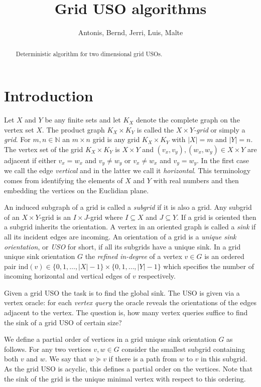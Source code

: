 \documentclass[a4paper,10pt]{article}
\title{Grid USO algorithms}
\author{Antonis, Bernd, Jerri, Luis, Malte}
\newcommand{\indegree}{refined in-degree\xspace}
\newcommand{\ind}{\ensuremath{\mathrm{ind}}}
\begin{document}
\maketitle 

\begin{abstract}
Deterministic algorithm for two dimensional grid USOs.
\end{abstract}

\section{Introduction}

Let $X$ and $Y$ be any finite sets and let $K_X$ denote the complete graph on the vertex set $X$. The product graph $K_X\times K_Y$ is called the \emph{$X\times Y$-grid} or simply a \emph{grid}. For $m,n \in \mathbb{N}$ an $m\times n$ grid is any grid $K_X\times K_Y$ with $|X| = m$ and $|Y| = n$. The vertex set of the grid $K_X\times K_Y$ is $X\times Y$ and $(v_x,v_y),(w_x,w_y) \in X\times Y$ are adjacent if either $v_x = w_x$ and $v_y \not= w_y$ or $v_x \not= w_x$ and $v_y = w_y$. In the first case we call the edge \emph{vertical} and in the latter we call it \emph{horizontal}. This terminology comes from identifying the elements of $X$ and $Y$ with real numbers and then embedding the vertices on the Euclidian plane. 

An induced subgraph of a grid is called a \emph{subgrid} if it is also a grid. Any subgrid of an $X\times Y$-grid is an $I\times J$-grid where $I \subseteq X$ and $J \subseteq Y$. If a grid is oriented then a subgrid inherits the orientation. A vertex in an oriented graph is called a \emph{sink} if all its incident edges are incoming. An orientation of a grid is a \emph{unique sink orientation}, or \emph{USO} for short, if all its subgrids have a unique sink. In a grid unique sink orientation $G$ the \emph{\indegree} of a vertex $v \in G$ is an ordered pair $\ind (v) \in \{0,1,\ldots,|X|-1\}\times \{0,1,\ldots,|Y|-1\}$ which specifies the number of incoming horizontal and vertical edges of $v$ respectively. 

Given a grid USO the task is to find the global sink. The USO is given via a vertex oracle: for each \emph{vertex query} the oracle reveals the orientations of the edges adjacent to the vertex. The question is, how many vertex queries suffice to find the sink of a grid USO of certain size?

We define a partial order of vertices in a grid unique sink orientation $G$ as follows. For any two vertices $v,w \in G$ consider the smallest subgrid containing both $v$ and $w$. We say that $w \succeq v$ if there is a path from $w$ to $v$ in this subgrid. As the grid USO is acyclic, this defines a partial order on the vertices. Note that the sink of the grid is the unique minimal vertex with respect to this ordering. 
\end{document}
